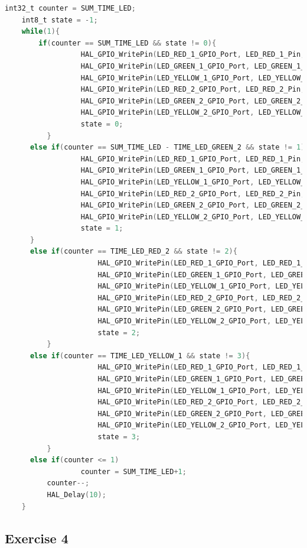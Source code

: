 \documentclass[twoside, final]{hcmut_report}
\begin{document}
\begin{lstlisting}[language=C, caption=Source code for Exercise 3]
    int32_t counter = SUM_TIME_LED;
    int8_t state = -1;
    while(1){
        if(counter == SUM_TIME_LED && state != 0){
		  		  HAL_GPIO_WritePin(LED_RED_1_GPIO_Port, LED_RED_1_Pin, 0);
		  		  HAL_GPIO_WritePin(LED_GREEN_1_GPIO_Port, LED_GREEN_1_Pin, 1);
		  		  HAL_GPIO_WritePin(LED_YELLOW_1_GPIO_Port, LED_YELLOW_1_Pin, 1);
		  	  	  HAL_GPIO_WritePin(LED_RED_2_GPIO_Port, LED_RED_2_Pin, 1);
				  HAL_GPIO_WritePin(LED_GREEN_2_GPIO_Port, LED_GREEN_2_Pin, 0);
				  HAL_GPIO_WritePin(LED_YELLOW_2_GPIO_Port, LED_YELLOW_2_Pin, 1);
	  	  		  state = 0;
	  	  }
	  else if(counter == SUM_TIME_LED - TIME_LED_GREEN_2 && state != 1){
  		  	  	  HAL_GPIO_WritePin(LED_RED_1_GPIO_Port, LED_RED_1_Pin, 0);
  		  	  	  HAL_GPIO_WritePin(LED_GREEN_1_GPIO_Port, LED_GREEN_1_Pin, 1);
  		  	  	  HAL_GPIO_WritePin(LED_YELLOW_1_GPIO_Port, LED_YELLOW_1_Pin, 1);
  	  	  	  	  HAL_GPIO_WritePin(LED_RED_2_GPIO_Port, LED_RED_2_Pin, 1);
  	  	  	  	  HAL_GPIO_WritePin(LED_GREEN_2_GPIO_Port, LED_GREEN_2_Pin, 1);
  	  	  	  	  HAL_GPIO_WritePin(LED_YELLOW_2_GPIO_Port, LED_YELLOW_2_Pin, 0);
  	  	  	  	  state = 1;
	  }
	  else if(counter == TIME_LED_RED_2 && state != 2){
	  		  		  HAL_GPIO_WritePin(LED_RED_1_GPIO_Port, LED_RED_1_Pin, 1);
	  		  		  HAL_GPIO_WritePin(LED_GREEN_1_GPIO_Port, LED_GREEN_1_Pin, 0);
	  		  		  HAL_GPIO_WritePin(LED_YELLOW_1_GPIO_Port, LED_YELLOW_1_Pin, 1);
	  	  	  	  	  HAL_GPIO_WritePin(LED_RED_2_GPIO_Port, LED_RED_2_Pin, 0);
	  	  	  	  	  HAL_GPIO_WritePin(LED_GREEN_2_GPIO_Port, LED_GREEN_2_Pin, 1);
	  	  	  	  	  HAL_GPIO_WritePin(LED_YELLOW_2_GPIO_Port, LED_YELLOW_2_Pin, 1);
  	  		  		  state = 2;
	  	  }
	  else if(counter == TIME_LED_YELLOW_1 && state != 3){
		  		   	  HAL_GPIO_WritePin(LED_RED_1_GPIO_Port, LED_RED_1_Pin, 1);
		  		   	  HAL_GPIO_WritePin(LED_GREEN_1_GPIO_Port, LED_GREEN_1_Pin, 1);
		  		   	  HAL_GPIO_WritePin(LED_YELLOW_1_GPIO_Port, LED_YELLOW_1_Pin, 0);
	  	  	  	  	  HAL_GPIO_WritePin(LED_RED_2_GPIO_Port, LED_RED_2_Pin, 0);
	  	  	  	  	  HAL_GPIO_WritePin(LED_GREEN_2_GPIO_Port, LED_GREEN_2_Pin, 1);
	  	  	  	  	  HAL_GPIO_WritePin(LED_YELLOW_2_GPIO_Port, LED_YELLOW_2_Pin, 1);
		  		   	  state = 3;
	  	  }
	  else if(counter <= 1)
	  	  		  counter = SUM_TIME_LED+1;
	  	  counter--;
	  	  HAL_Delay(10);
    }
\end{lstlisting}
\subsection{Exercise 4}
\end{document}
